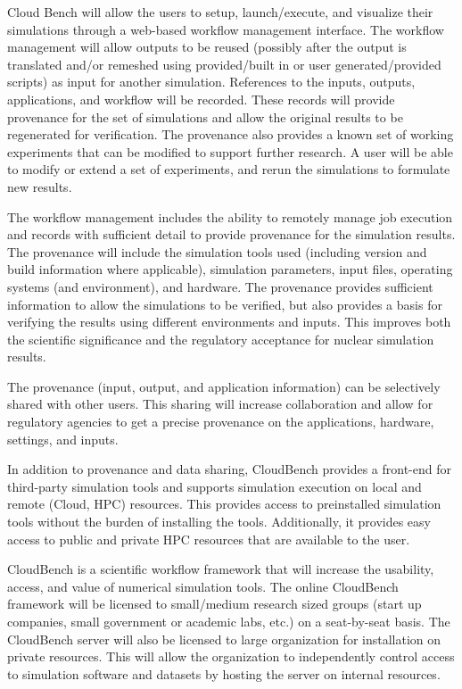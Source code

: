 Cloud Bench will allow the users to setup, launch/execute, and
visualize their simulations through a web-based workflow management
interface. The workflow management will allow outputs to be reused
(possibly after the output is translated and/or remeshed using
provided/built in or user generated/provided scripts) as input for
another simulation. References to the inputs, outputs, applications,
and workflow will be recorded. These records will provide provenance
for the set of simulations and allow the original results to be
regenerated for verification. The provenance also provides a known set
of working experiments that can be modified to support further
research. A user will be able to modify or extend a set of
experiments, and rerun the simulations to formulate new results.

The workflow management includes the ability to remotely manage job
execution and records with sufficient detail to provide provenance for the
simulation results. The provenance will include the simulation tools
used (including version and build information where applicable),
simulation parameters, input files, operating systems (and
environment), and hardware. The provenance provides
sufficient information to allow the simulations to be verified, but
also provides a basis for verifying the results using different
environments and inputs. This improves both the scientific
significance and the regulatory acceptance for nuclear simulation
results.

The provenance (input, output, and application information) can be
selectively shared with other users. This sharing will increase
collaboration and allow for regulatory agencies to get a precise
provenance on the applications, hardware, settings, and inputs.

In addition to provenance and data sharing, CloudBench provides a
front-end for third-party simulation tools and supports simulation
execution on local and remote (Cloud, HPC) resources.  This provides
access to preinstalled simulation tools without the burden of
installing the tools. Additionally, it provides easy access to public
and private HPC resources that are available to the user.

CloudBench is a scientific workflow framework that will increase the
usability, access, and value of numerical simulation tools. The online
CloudBench framework will be licensed to small/medium research sized
groups (start up companies, small government or academic labs, etc.)
on a seat-by-seat basis. The CloudBench server will also be licensed
to large organization for installation on private resources. This will
allow the organization to independently control access to simulation
software and datasets by hosting the server on internal
resources.

